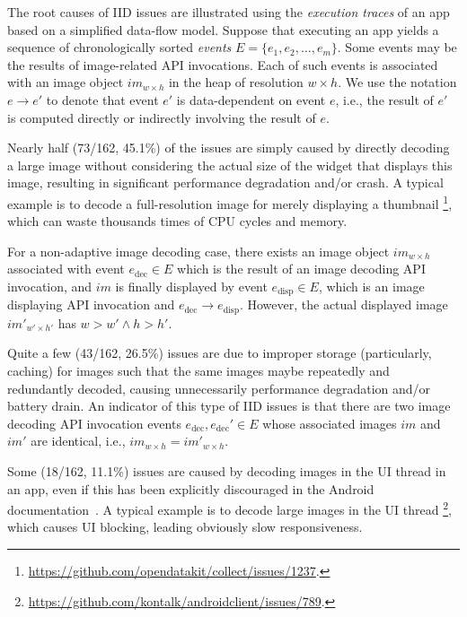 \newcommand{\edisplay}{e_{\mathrm{disp}}}
\newcommand{\edecode}{e_{\mathrm{dec}}}
\newcommand{\depends}[2]{#2\to#1}
\newcommand{\im}{\mathit{im}}

The root causes of IID issues are illustrated using the \emph{execution traces} of an app based on a simplified data-flow model.
Suppose that executing an app yields a sequence of chronologically sorted \emph{events} $E=\{e_1,e_2,\ldots,e_m\}$.
Some events may be the results of image-related API invocations. Each of such events is associated with an image object $\im_{w\times h}$ in the heap of resolution $w\times h$.
We use the notation $\depends{e'}{e}$ to denote that event $e'$ is data-dependent on event $e$, i.e.,
the result of $e'$ is computed directly or indirectly involving the result of $e$.

Nearly half (73/162, 45.1\%) of the issues are simply caused by directly decoding a large image without considering the actual size of the widget that displays this image, resulting in significant performance degradation and/or crash.
A typical example is to decode a full-resolution image for merely displaying a thumbnail%
\footnote{\url{https://github.com/opendatakit/collect/issues/1237}.}, which can waste thousands times of CPU cycles and memory.  

For a non-adaptive image decoding case, there exists an image object $\im_{w\times h}$ associated with event $\edecode\in E$ which is the result of an image decoding API invocation,
and $\im$ is finally displayed by event $\edisplay\in E$, which is an image displaying API invocation and $\depends{\edisplay}{\edecode}$. However, the actual displayed image $\im'_{w'\times h'}$ has
$w > w' \land h > h'$.

Quite a few (43/162, 26.5\%) issues are due to improper storage (particularly, caching) for images such that the same images maybe repeatedly and redundantly decoded,
causing unnecessarily performance degradation and/or battery drain.
An indicator of this type of IID issues is that there are two image decoding API invocation events
$\edecode,\edecode'\in E$ whose associated images $\im$ and $\im'$ are identical, i.e., $\im_{w\times h}=\im'_{w\times h}$.

Some (18/162, 11.1\%) issues are caused by decoding images in the UI thread in an app,
even if this has been explicitly discouraged in the Android documentation~\cite{handle_image}.
A typical example is to decode large images in the UI thread%
\footnote{\url{https://github.com/kontalk/androidclient/issues/789}.}, which causes UI blocking, leading obviously slow responsiveness.

